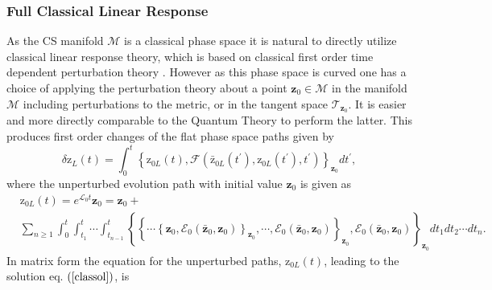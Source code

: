\documentclass[aps,preprint]{revtex4}%
\begin{document}
\subsubsection{Full Classical Linear Response}

As the CS manifold $\mathcal{M}$ is a classical phase space it is natural to
directly utilize classical linear response theory, which is based on classical
first order time dependent perturbation theory \cite{Thirring1}. However as
this phase space is curved one has a choice of applying the perturbation
theory about a point $\mathbf{z}_{0}\in\mathcal{M}$ in the manifold
$\mathcal{M}$ including perturbations to the metric, or in the tangent space
$\mathcal{T}_{\mathbf{z}_{0}}$. It is easier and more directly comparable to
the Quantum Theory to perform the latter. This produces first order changes of
the flat phase space paths given by
\begin{equation}
\delta\mathrm{z}_{L}\left(  t\right)  =\int_{0}^{t}\left\{  \mathrm{z}%
_{0L}\left(  t\right)  ,\mathcal{F}\left(  \mathrm{\bar{z}}_{0L}\left(
t^{\prime}\right)  ,\mathrm{z}_{0L}\left(  t^{\prime}\right)  \mathbf{,}%
t^{\prime}\right)  \right\}  _{\mathbf{z}_{0}}dt^{\prime},
\end{equation}
where the unperturbed evolution path with initial value $\mathbf{z}_{0}$ is
given as
\begin{align}
&  \mathrm{z}_{0L}\left(  t\right)  =e^{\mathcal{L}_{0}t}\mathbf{z}%
_{0}=\mathbf{z}_{0}+\nonumber\\
&  \sum_{n\geq1}\int_{0}^{t}\int_{t_{1}}^{t}\cdots\int_{t_{n-1}}^{t}\left\{
\left\{  \cdots\left\{  \mathbf{z}_{0}\mathbf{,}\mathcal{E}_{0}\left(
\mathbf{\bar{z}}_{0},\mathbf{z}_{0}\right)  \right\}  _{\mathbf{z}_{0}}%
,\cdots,\mathcal{E}_{0}\left(  \mathbf{\bar{z}}_{0},\mathbf{z}_{0}\right)
\right\}  _{\mathbf{z}_{0}},\mathcal{E}_{0}\left(  \mathbf{\bar{z}}%
_{0},\mathbf{z}_{0}\right)  \right\}  _{\mathbf{z}_{0}}dt_{1}dt_{2}\cdots
dt_{n}. \label{clasol}%
\end{align}
In matrix form the equation for the unperturbed paths, $\mathrm{z}_{0L}\left(
t\right)  $, leading to the solution eq. $\left(  \ref{classol}\right)  $, is
\end{document}
